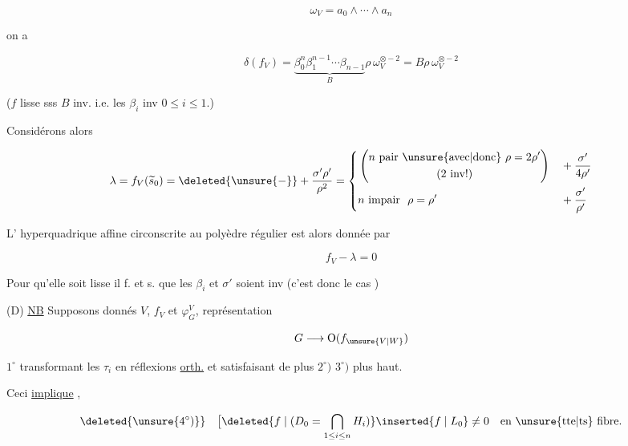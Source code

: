 \[
\omega_V=a_0\wedge\cdots\wedge a_n
\]

on a

\[
\delta(f_V)=\underbrace{\beta_0^n\beta_1^{n-1}\cdots\beta_{n-1}}_{B}
 \rho\,\omega_V^{\otimes-2}=B\rho\,\omega_V^{\otimes-2}
\]

($f$ lisse sss $B$ inv. i.e. les $\beta_i$ inv \quad $0\le i\le1$.)

Considérons alors

\[
\lambda=f_V(\widetilde{s}_0)=\deleted{\unsure{-}}+
\frac{\sigma'\rho'}{\rho^2}
=\left\{\begin{aligned}
&\left(\begin{gathered}n\text{ pair \unsure{avec|donc} }\rho=2\rho'\\(2\text{ inv!})\end{gathered}\right)
&&+\frac{\sigma'}{4\rho'}\\
&n\text{ impair }\ \rho=\rho'&&+\frac{\sigma'}{\rho'}
\end{aligned}\right.
\]

L' hyperquadrique affine circonscrite au polyèdre régulier est alors donnée par

\[
f_V-\lambda=0
\]

Pour qu'elle soit   lisse il f. et s. que les $\beta_i$ et $\sigma'$ soient inv (c'est donc le cas \uline{})

(D) \uline{NB} Supposons donnés $V$, $f_V$ et $\varphi_G^V$, représentation 

\[
G\longrightarrow \mathrm O(f_{\unsure{V|W}})
\]

$1^\circ$ transformant les $\tau_i$ en réflexions \uline{orth.} et satisfaisant de plus $2^\circ)$ $3^\circ)$ plus haut.

Ceci \uline{implique} ,

\[
\deleted{\unsure{4^\circ)}}\quad
\bigl[\deleted{f\mid(D_0=\bigcap_{1\le i\le n}H_i)}
\inserted{f\mid L_0}\ne0\quad\text{en \unsure{tte|ts} fibre.}
\]

